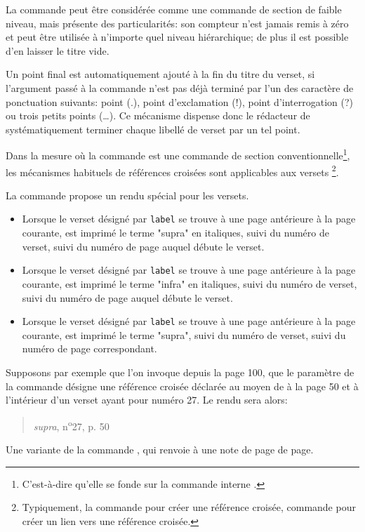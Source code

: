 \documentclass{ltxdockit}
\begin{document}
\begin{ltxsyntax}


La commande  peut être considérée comme une commande de section de faible niveau, mais présente des particularités: son compteur n'est jamais remis à zéro et peut être utilisée à n'importe quel niveau hiérarchique; de plus il est possible d'en laisser le titre vide.

Un point final est automatiquement ajouté à la fin du titre du verset, si l'argument passé à la commande n'est pas déjà terminé par l'un des caractère de ponctuation suivants: point (.), point d'exclamation (!), point d'interrogation (?) ou trois petits points (\ldots). Ce mécanisme dispense donc le rédacteur de systématiquement terminer chaque libellé de verset par un tel point.


Dans la mesure où la commande  est une commande de section conventionnelle\footnote{C'est-à-dire qu'elle se fonde sur la commande interne \cmd{\\@startsection}.}, les mécanismes habituels de références croisées sont applicables aux versets \footnote{Typiquement, la commande  pour créer une référence croisée, commande  pour créer un lien vers une référence croisée.}.

La commande  propose un rendu spécial pour les versets.
\begin{itemize}
\item Lorsque le verset désigné par \texttt{label} se trouve à une page antérieure à la page courante, est imprimé le terme "supra" en italiques, suivi du numéro de verset, suivi du numéro de page auquel débute le verset.

\item Lorsque le verset désigné par \texttt{label} se trouve à une page antérieure à la page courante, est imprimé le terme "infra" en italiques, suivi du numéro de verset, suivi du numéro de page auquel débute le verset.

\item Lorsque le verset désigné par \texttt{label} se trouve à une page antérieure à la page courante, est imprimé le terme "supra", suivi du numéro de verset, suivi du numéro de page correspondant.
\end{itemize}

Supposons par exemple que l'on invoque  depuis la page 100, que le paramètre de la commande désigne une référence croisée déclarée au moyen de  à la page 50 et à l'intérieur d'un verset ayant pour numéro 27. 
Le rendu sera alors:

\begin{quote}
\emph{supra}, n\textsuperscript{o}27, p. 50
\end{quote}


Une variante de la commande , qui renvoie à une note de page de page.

\end{ltxsyntax}
\end{document}
